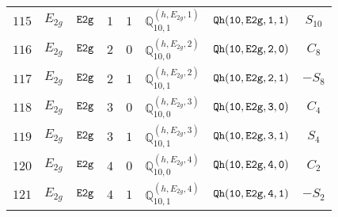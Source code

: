 \documentclass[fleqn,8pt]{jsarticle}
\begin{document}
\begin{table}[ht!]
\begin{center}
\begin{tabular}{cccccccc}
$ 115 $ & $ E_{2g} $ & $ {\tt E2g} $ & $ 1 $ & $ 1 $ & $ \mathbb{Q}_{10,1}^{(h,E_{2g},1)} $ & $ {\tt Qh(10,E2g,1,1)} $ & $ S_{10} $ \\
$ 116 $ & $ E_{2g} $ & $ {\tt E2g} $ & $ 2 $ & $ 0 $ & $ \mathbb{Q}_{10,0}^{(h,E_{2g},2)} $ & $ {\tt Qh(10,E2g,2,0)} $ & $ C_{8} $ \\
$ 117 $ & $ E_{2g} $ & $ {\tt E2g} $ & $ 2 $ & $ 1 $ & $ \mathbb{Q}_{10,1}^{(h,E_{2g},2)} $ & $ {\tt Qh(10,E2g,2,1)} $ & $ - S_{8} $ \\
$ 118 $ & $ E_{2g} $ & $ {\tt E2g} $ & $ 3 $ & $ 0 $ & $ \mathbb{Q}_{10,0}^{(h,E_{2g},3)} $ & $ {\tt Qh(10,E2g,3,0)} $ & $ C_{4} $ \\
$ 119 $ & $ E_{2g} $ & $ {\tt E2g} $ & $ 3 $ & $ 1 $ & $ \mathbb{Q}_{10,1}^{(h,E_{2g},3)} $ & $ {\tt Qh(10,E2g,3,1)} $ & $ S_{4} $ \\
$ 120 $ & $ E_{2g} $ & $ {\tt E2g} $ & $ 4 $ & $ 0 $ & $ \mathbb{Q}_{10,0}^{(h,E_{2g},4)} $ & $ {\tt Qh(10,E2g,4,0)} $ & $ C_{2} $ \\
$ 121 $ & $ E_{2g} $ & $ {\tt E2g} $ & $ 4 $ & $ 1 $ & $ \mathbb{Q}_{10,1}^{(h,E_{2g},4)} $ & $ {\tt Qh(10,E2g,4,1)} $ & $ - S_{2} $ \\
 \hline \hline
\end{tabular}
\end{center}
\end{table}
\end{document}
